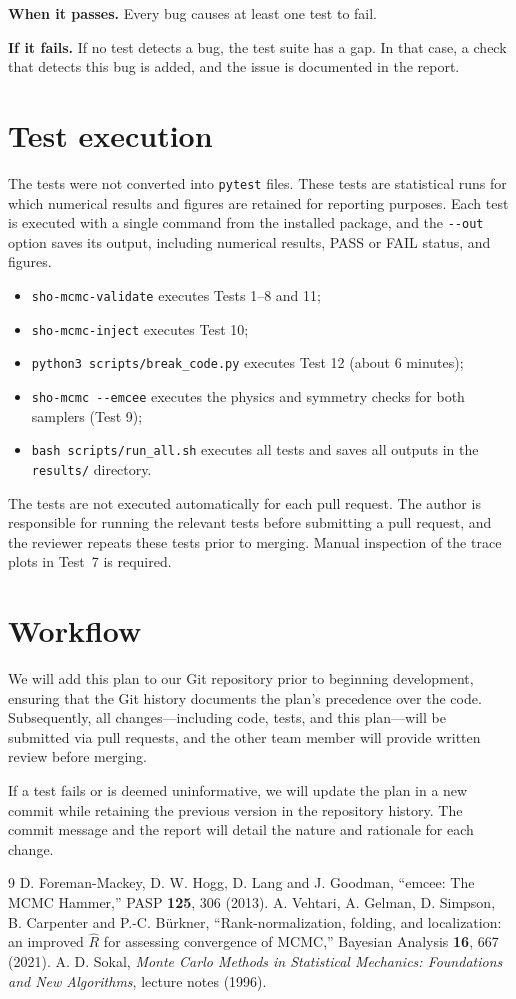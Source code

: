 \documentclass[11pt]{article}
\begin{document}
\textbf{When it passes.} Every bug causes at least one test to fail.

\textbf{If it fails.} If no test detects a bug, the test suite has a gap. In that case, a check that detects this bug is added, and the issue is documented in the report.

\section{Test execution}
The tests were not converted into \texttt{pytest} files. These tests are statistical runs for which numerical results and figures are retained for reporting purposes. Each test is executed with a single command from the installed package, and the \texttt{-{}-out} option saves its output, including numerical results, PASS or FAIL status, and figures.
\begin{itemize}
  \item \texttt{sho-mcmc-validate} executes Tests 1--8 and 11;
  \item \texttt{sho-mcmc-inject} executes Test 10;
  \item \texttt{python3 scripts/break\_code.py} executes Test 12 (about 6 minutes);
  \item \texttt{sho-mcmc -{}-emcee} executes the physics and symmetry checks for both samplers (Test 9);
  \item \texttt{bash scripts/run\_all.sh} executes all tests and saves all outputs in the \texttt{results/} directory.
\end{itemize}
The tests are not executed automatically for each pull request. The author is responsible for running the relevant tests before submitting a pull request, and the reviewer repeats these tests prior to merging. Manual inspection of the trace plots in Test~7 is required.

\section{Workflow}
We will add this plan to our Git repository prior to beginning development, ensuring that the Git history documents the plan's precedence over the code. Subsequently, all changes---including code, tests, and this plan---will be submitted via pull requests, and the other team member will provide written review before merging.

If a test fails or is deemed uninformative, we will update the plan in a new commit while retaining the previous version in the repository history. The commit message and the report will detail the nature and rationale for each change.


\begin{thebibliography}{9}
 D. Foreman-Mackey, D. W. Hogg, D. Lang and J. Goodman, ``emcee: The MCMC Hammer,'' PASP \textbf{125}, 306 (2013).
 A. Vehtari, A. Gelman, D. Simpson, B. Carpenter and P.-C. B\"urkner, ``Rank-normalization, folding, and localization: an improved $\hat R$ for assessing convergence of MCMC,'' Bayesian Analysis \textbf{16}, 667 (2021).
 A. D. Sokal, \emph{Monte Carlo Methods in Statistical Mechanics: Foundations and New Algorithms}, lecture notes (1996).
\end{thebibliography}
\end{document}
